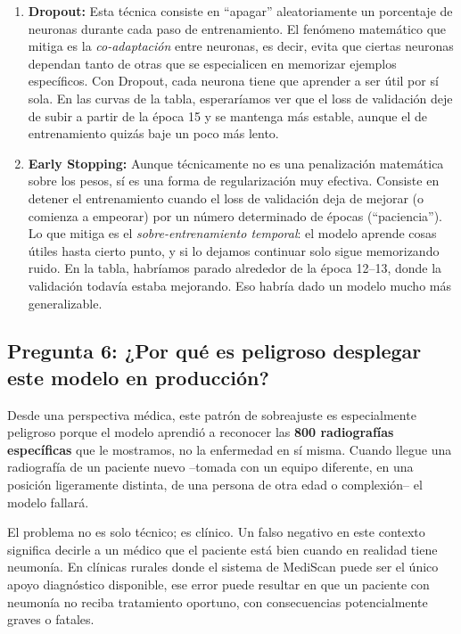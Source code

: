 \documentclass[12pt, letterpaper]{article}
\begin{document}
\begin{enumerate}[leftmargin=1.5cm]

    \item \textbf{Dropout:} Esta técnica consiste en ``apagar'' aleatoriamente un porcentaje de
    neuronas durante cada paso de entrenamiento. El fenómeno matemático que mitiga es la
    \textit{co-adaptación} entre neuronas, es decir, evita que ciertas neuronas dependan tanto
    de otras que se especialicen en memorizar ejemplos específicos. Con Dropout, cada neurona
    tiene que aprender a ser útil por sí sola. En las curvas de la tabla, esperaríamos ver que
    el loss de validación deje de subir a partir de la época 15 y se mantenga más estable, aunque
    el de entrenamiento quizás baje un poco más lento.

    \item \textbf{Early Stopping:} Aunque técnicamente no es una penalización matemática sobre
    los pesos, sí es una forma de regularización muy efectiva. Consiste en detener el entrenamiento
    cuando el loss de validación deja de mejorar (o comienza a empeorar) por un número determinado
    de épocas (``paciencia''). Lo que mitiga es el \textit{sobre-entrenamiento temporal}: el modelo
    aprende cosas útiles hasta cierto punto, y si lo dejamos continuar solo sigue memorizando
    ruido. En la tabla, habríamos parado alrededor de la época 12--13, donde la validación
    todavía estaba mejorando. Eso habría dado un modelo mucho más generalizable.

\end{enumerate}

\subsection{Pregunta 6: ¿Por qué es peligroso desplegar este modelo en producción?}

Desde una perspectiva médica, este patrón de sobreajuste es especialmente peligroso porque el
modelo aprendió a reconocer las \textbf{800 radiografías específicas} que le mostramos, no la
enfermedad en sí misma. Cuando llegue una radiografía de un paciente nuevo --tomada con un equipo
diferente, en una posición ligeramente distinta, de una persona de otra edad o complexión-- el
modelo fallará.

El problema no es solo técnico; es clínico. Un falso negativo en este contexto significa decirle
a un médico que el paciente está bien cuando en realidad tiene neumonía. En clínicas rurales donde
el sistema de MediScan puede ser el único apoyo diagnóstico disponible, ese error puede resultar
en que un paciente con neumonía no reciba tratamiento oportuno, con consecuencias potencialmente
graves o fatales.
\end{document}
